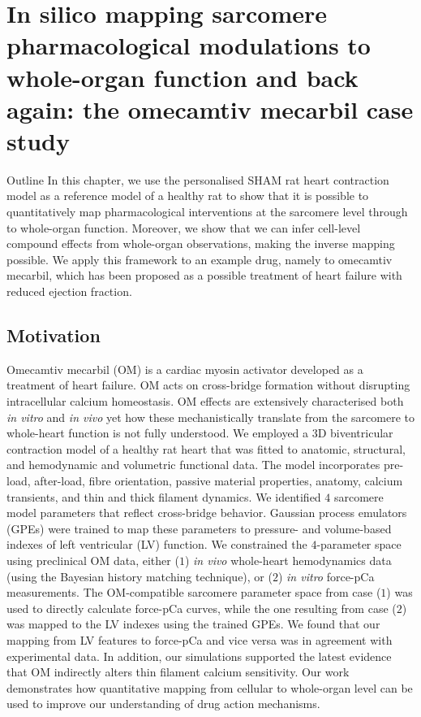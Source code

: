 \chapter{In silico mapping sarcomere pharmacological modulations to whole-organ function and back again: the omecamtiv mecarbil case study}\label{cha:chapter5}
%
%
%
\begin{remark}{Outline}
    In this chapter, we use the personalised SHAM rat heart contraction model as a reference model of a healthy rat to show that it is possible to quantitatively map pharmacological interventions at the sarcomere level through to whole-organ function. Moreover, we show that we can infer cell-level compound effects from whole-organ observations, making the inverse mapping possible. We apply this framework to an example drug, namely to omecamtiv mecarbil, which has been proposed as a possible treatment of heart failure with reduced ejection fraction.
\end{remark}


%
%
%
\section{Motivation}\label{sec:ch5motivation}
Omecamtiv mecarbil (OM) is a cardiac myosin activator developed as a treatment of heart failure. OM acts on cross-bridge formation without disrupting intracellular calcium homeostasis. OM effects are extensively characterised both \textit{in vitro} and \textit{in vivo} yet how these mechanistically translate from the sarcomere to whole-heart function is not fully understood. We employed a $3$D biventricular contraction model of a healthy rat heart that was fitted to anatomic, structural, and hemodynamic and volumetric functional data. The model incorporates pre-load, after-load, fibre orientation, passive material properties, anatomy, calcium transients, and thin and thick filament dynamics. We identified $4$ sarcomere model parameters that reflect cross-bridge behavior. Gaussian process emulators (GPEs) were trained to map these parameters to pressure- and volume-based indexes of left ventricular (LV) function. We constrained the $4$-parameter space using preclinical OM data, either ($1$) \textit{in vivo} whole-heart hemodynamics data (using the Bayesian history matching technique), or ($2$) \textit{in vitro} force-pCa measurements. The OM-compatible sarcomere parameter space from case ($1$) was used to directly calculate force-pCa curves, while the one resulting from case ($2$) was mapped to the LV indexes using the trained GPEs. We found that our mapping from LV features to force-pCa and vice versa was in agreement with experimental data. In addition, our simulations supported the latest evidence that OM indirectly alters thin filament calcium sensitivity. Our work demonstrates how quantitative mapping from cellular to whole-organ level can be used to improve our understanding of drug action mechanisms.

